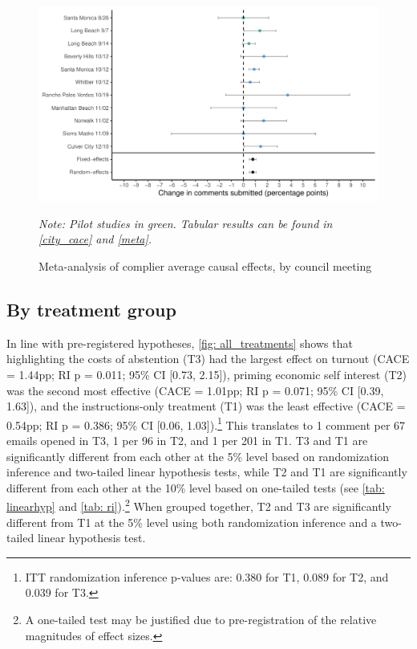 \documentclass[12pt,final,fleqn]{article}
\theoremstyle{plain}
\begin{document}
\begin{figure}[H]
\includegraphics[width = \textwidth]{../figs/fg2.pdf}
\caption{Meta-analysis of complier average causal effects, by council meeting}
\vspace{-0.5cm}
{\small \textit{Note: Pilot studies in green. Tabular results can be found in \autoref{city_cace} and \autoref{meta}.}}
\label{fig: meta}
\end{figure}


\subsection{By treatment group}\label{sec: results_group}

In line with pre-registered hypotheses, \autoref{fig: all_treatments} shows that highlighting the costs of abstention (T3) had the largest effect on turnout (CACE = 1.44pp; RI p = 0.011; 95\% CI [0.73, 2.15]), priming economic self interest (T2) was the second most effective (CACE = 1.01pp; RI p = 0.071; 95\% CI [0.39, 1.63]), and the instructions-only treatment (T1) was the least effective (CACE = 0.54pp; RI p = 0.386; 95\% CI [0.06, 1.03]).\footnote{ITT randomization inference p-values are: 0.380 for T1, 0.089 for T2, and 0.039 for T3.} This translates to 1 comment per 67 emails opened in T3, 1 per 96 in T2, and 1 per 201 in T1. T3 and T1 are significantly different from each other at the 5\% level based on randomization inference and two-tailed linear hypothesis tests, while T2 and T1 are significantly different from each other at the 10\% level based on one-tailed tests (see \autoref{tab: linearhyp} and \autoref{tab: ri}).\footnote{A one-tailed test may be justified due to pre-registration of the relative magnitudes of effect sizes.} When grouped together, T2 and T3 are significantly different from T1 at the 5\% level using both randomization inference and a two-tailed linear hypothesis test. 
\end{document}
